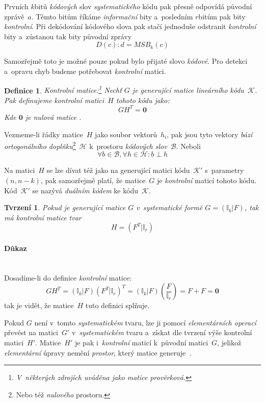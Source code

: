 \documentclass[thesis=M,czech,hidelinks]{FITthesis}[2012/06/26]
\newcommand{\0}{{\textcolor[gray]{0.75}{0}}}
\newtheorem{tvrzeni}{Tvrzení}
\newtheorem{definice}{Definice}
\begin{document}
Prvních $k$\;bitů \emph{kódových} slov \emph{systematického} kódu pak přesně
odpovídá původní zprávě~$a$. Těmto bitům říkáme \emph{informační} bity
a~posledním $r$\;bitům pak bity \emph{kontrolní}. Při dekódování kódového slova
pak stačí jednoduše odstranit \emph{kontrolní} bity a~zůstanou tak bity původní
zprávy
$$ D(c) : d = MSB_k(c) $$

Samozřejmě toto je možné pouze pokud bylo přijaté slovo \emph{kódové}. Pro
detekci a~opravu chyb budeme potřebovat \emph{kontrolní} matici.

\begin{definice}{Kontrolní matice:}\footnote{
    V~některých zdrojích uváděna jako matice \emph{prověrková}.
}
    Nechť $G$ je \emph{generující} matice \emph{lineárního kódu}~$\mathcal{K}$.
    Pak definujeme \emph{kontrolní matici}~$H$ tohoto kódu jako:
    $$ G H^T = \textbf{0} $$
    Kde $\textbf{0}$ je \emph{nulová matice} .
\end{definice}


Vezmeme-li řádky matice~$H$ jako soubor vektorů~$h_i$, pak jsou tyto vektory
\emph{bází} \emph{ortogonálního doplňku}\footnote{
    Nebo též \emph{nulového} prostoru.
}~$\mathcal{H}$ k~prostoru \emph{kódových slov}~$\mathcal{B}$. Neboli
$$ \forall b \in \mathcal{B}, \forall h \in \mathcal{H} : b \perp h $$

Na matici~$H$ se lze dívat též jako na generující matici kódu~$\mathcal{K}'$
s~parametry~$(n,n-k)$, pak samozřejmě platí, že matice~$G$ je \emph{kontrolní}
maticí tohoto kódu. Kód~$\mathcal{K}'$ se nazývá \emph{duálním kódem} ke
kódu~$\mathcal{K}$.

\begin{tvrzeni}
    Pokud je \emph{generující} matice $G$ v~systematické formě
    $G=(\mathbb{I}_k|F)$, tak má \emph{kontrolní} matice tvar
    $$ H=(F^T|\mathbb{I}_r) $$
\end{tvrzeni}

\paragraph{Důkaz} \hfil \\
Dosadíme-li do definice \emph{kontrolní} matice:
$$
    G H^T = (\mathbb{I}_k|F)(F^T|\mathbb{I}_r)^T =
    (\mathbb{I}_k|F)(\frac{F}{\mathbb{I}_r}) = F + F = \textbf{0}
$$
tak je vidět, že matice~$H$ tuto definici splňuje.

Pokud $G$ není v~tomto \emph{systematickém} tvaru, lze ji pomocí
\emph{elementárních operací} převést na matici~$G'$ v~\emph{systematickém} tvaru
a~získat dle tvrzení výše kontrolní matici~$H'$. Matice~$H'$ je pak
i~\emph{kontrolní} maticí k~původní matici~$G$, jelikož \emph{elementární}
úpravy nemění \emph{prostor}, který matice generuje~\cite{Adamek}.
\end{document}
